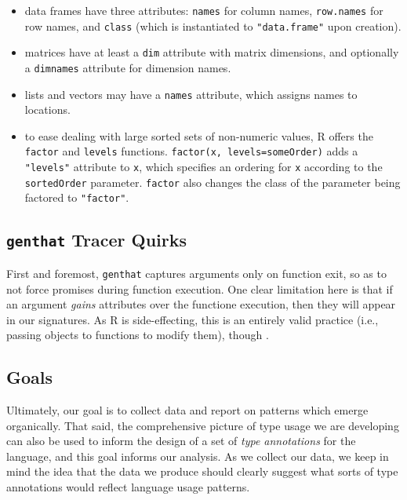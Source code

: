\documentclass[acmsmall,10pt,review,anonymous]{acmart}\settopmatter{printfolios=true,printccs=false,printacmref=false}
\newcommand{\code}[1]{\lstinline|#1|\xspace}
\begin{document}
\begin{itemize}

	\item data frames have three attributes: {\tt names} for column names, {\tt row.names} for row names, and {\tt class} (which is instantiated to {\tt "data.frame"} upon creation).
	
	\item matrices have at least a {\tt dim} attribute with matrix dimensions, and optionally a {\tt dimnames} attribute for dimension names.

	\item lists and vectors may have a {\tt names} attribute, which assigns names to locations.
	
	\item to ease dealing with large sorted sets of non-numeric values, R offers the \code{factor} and \code{levels} functions.
	\code{factor(x, levels=someOrder)} adds a {\tt "levels"} attribute to \code{x}, which specifies an ordering for \code{x} according to the \code{sortedOrder} parameter.
	\code{factor} also changes the class of the parameter being factored to \code{"factor"}.

\end{itemize}

%
%
%
%
\subsection{{\tt genthat} Tracer Quirks}

First and foremost, {\tt genthat} captures arguments only on function exit,
so as to not force promises during function execution.   One
clear limitation here is that if an argument \textit{gains} attributes over
the functione execution, then they will appear in our signatures.  As R is
side-effecting, this is an entirely valid practice (i.e., passing objects to
functions to modify them), though .


%
%
%
%
\subsection{Goals}

Ultimately, our goal is to collect data and report on patterns which emerge
organically.  That said, the comprehensive picture of type usage we are
developing can also be used to inform the design of a set of \textit{type
  annotations} for the language, and this goal informs our analysis.  As we
collect our data, we keep in mind the idea that the data we produce should
clearly suggest what sorts of type annotations would reflect language usage
patterns.
\end{document}
